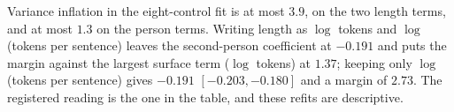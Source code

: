 Variance inflation in the eight-control fit is at most $3.9$, on the two length terms, and at most $1.3$ on the person terms. Writing length as $\log$ tokens and $\log$(tokens per sentence) leaves the second-person coefficient at $-0.191$ and puts the margin against the largest surface term ($\log$ tokens) at $1.37$; keeping only $\log$(tokens per sentence) gives $-0.191$ $[-0.203,-0.180]$ and a margin of $2.73$. The registered reading is the one in the table, and these refits are descriptive.